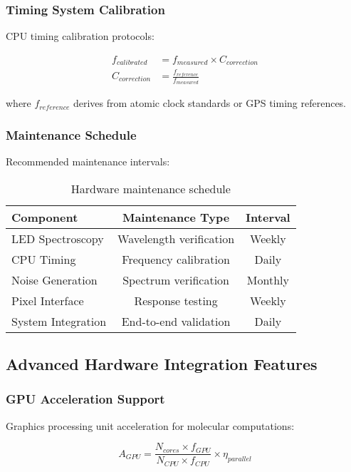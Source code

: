 \subsubsection{Timing System Calibration}

CPU timing calibration protocols:

\begin{align}
f_{calibrated} &= f_{measured} \times C_{correction} \\
C_{correction} &= \frac{f_{reference}}{f_{measured}}
\end{align}

where $f_{reference}$ derives from atomic clock standards or GPS timing references.

\subsubsection{Maintenance Schedule}

Recommended maintenance intervals:

\begin{table}[H]
\centering
\begin{tabular}{|l|c|c|}
\hline
\textbf{Component} & \textbf{Maintenance Type} & \textbf{Interval} \\
\hline
LED Spectroscopy & Wavelength verification & Weekly \\
CPU Timing & Frequency calibration & Daily \\
Noise Generation & Spectrum verification & Monthly \\
Pixel Interface & Response testing & Weekly \\
System Integration & End-to-end validation & Daily \\
\hline
\end{tabular}
\caption{Hardware maintenance schedule}
\end{table}

\subsection{Advanced Hardware Integration Features}

\subsubsection{GPU Acceleration Support}

Graphics processing unit acceleration for molecular computations:

\begin{equation}
A_{GPU} = \frac{N_{cores} \times f_{GPU}}{N_{CPU} \times f_{CPU}} \times \eta_{parallel}
\end{equation}

